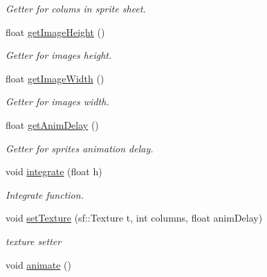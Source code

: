 \begin{DoxyCompactItemize}
\begin{DoxyCompactList}\small\item\em Getter for colums in sprite sheet. \end{DoxyCompactList}\item 
\hypertarget{class_movable_a5ca927f75fb88aff35060ea7c3dc057f}{float \hyperlink{class_movable_a5ca927f75fb88aff35060ea7c3dc057f}{get\-Image\-Height} ()}\label{class_movable_a5ca927f75fb88aff35060ea7c3dc057f}

\begin{DoxyCompactList}\small\item\em Getter for images height. \end{DoxyCompactList}\item 
\hypertarget{class_movable_a2fbc46d99e0fde3f8e6f91dee513ae64}{float \hyperlink{class_movable_a2fbc46d99e0fde3f8e6f91dee513ae64}{get\-Image\-Width} ()}\label{class_movable_a2fbc46d99e0fde3f8e6f91dee513ae64}

\begin{DoxyCompactList}\small\item\em Getter for images width. \end{DoxyCompactList}\item 
\hypertarget{class_movable_ab6e4a29915ebae856e3cb74ffa51c66d}{float \hyperlink{class_movable_ab6e4a29915ebae856e3cb74ffa51c66d}{get\-Anim\-Delay} ()}\label{class_movable_ab6e4a29915ebae856e3cb74ffa51c66d}

\begin{DoxyCompactList}\small\item\em Getter for sprites animation delay. \end{DoxyCompactList}\item 
void \hyperlink{class_movable_a48eda08ba135395d3a033ac3bd395d13}{integrate} (float h)
\begin{DoxyCompactList}\small\item\em Integrate function. \end{DoxyCompactList}\item 
void \hyperlink{class_movable_a85b93f096b982eff2683ec3d185bbe35}{set\-Texture} (sf\-::\-Texture t, int columns, float anim\-Delay)
\begin{DoxyCompactList}\small\item\em texture setter \end{DoxyCompactList}\item 
\hypertarget{class_movable_a7a9ea13658207006945ff3d151cf59f7}{void \hyperlink{class_movable_a7a9ea13658207006945ff3d151cf59f7}{animate} ()}\label{class_movable_a7a9ea13658207006945ff3d151cf59f7}


\end{DoxyCompactItemize}
